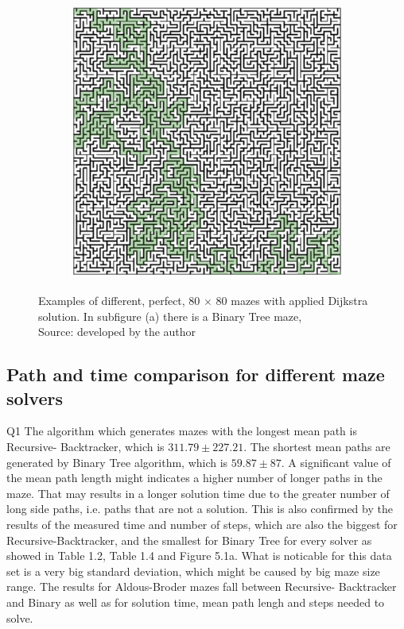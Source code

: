 \begin{figure}[!h]
\begin{subfigure}{.33\textwidth}
	  \caption{}
	  \label{fig:sub2}
	\end{subfigure}
    \begin{subfigure}{.33\textwidth}
        \centering
        \includegraphics[width=1\linewidth]{perfectRecursive.png}
        \caption{}
        \label{fig:sub2}
      \end{subfigure}
	\caption{Examples of different, perfect,  80 $\times$ 80 mazes with applied Dijkstra solution. In subfigure (a) there is a Binary Tree maze, \\Source: developed by the author}
	\label{fig:test}
	\end{figure}
\subsection{Path and time comparison for different maze solvers}Q1
The algorithm which generates mazes with the longest mean path is Recursive- Backtracker, which is $311.79\pm 227.21$. The shortest mean paths are generated by
Binary Tree algorithm, which is $59.87\pm 87$. A significant value of the mean path length might indicates a higher number of longer paths in the maze. That 
may results in a longer solution time due to the greater number of long side paths, i.e. paths that are not a solution. This is also confirmed by the results of
the measured time and number of steps, which are also the biggest for Recursive-Backtracker, and the smallest for Binary Tree for every solver as showed in 
Table 1.2, Table 1.4 and Figure 5.1a. What is noticable for this data set is a very big standard deviation, which might be caused by big maze size range.
The results for Aldous-Broder mazes fall  between Recursive- Backtracker and Binary as well as for solution time, mean path lengh and steps needed to solve.


